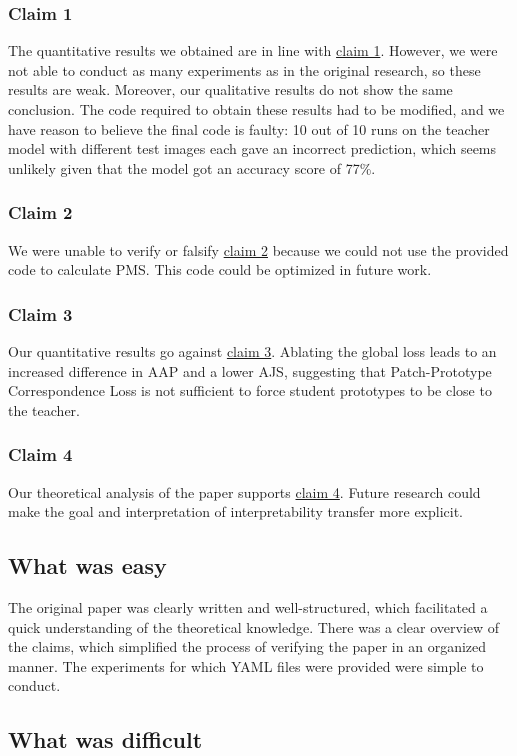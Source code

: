 \subsubsection{Claim 1}
The quantitative results we obtained are in line with \hyperlink{claim1}{claim 1}. However, we were not able to conduct as many experiments as in the original research, so these results are weak. Moreover, our qualitative results do not show the same conclusion. The code required to obtain these results had to be modified, and we have reason to believe the final code is faulty: 10 out of 10 runs on the teacher model with different test images each gave an incorrect prediction, which seems unlikely given that the model got an accuracy score of 77\%.\par
\subsubsection{Claim 2}
We were unable to verify or falsify \hyperlink{claim2}{claim 2} because we could not use the provided code to calculate PMS. This code could be optimized in future work.\par
\subsubsection{Claim 3}
Our quantitative results go against \hyperlink{claim3}{claim 3}. Ablating the global loss leads to an increased difference in AAP and a lower AJS, suggesting that Patch-Prototype Correspondence Loss is not sufficient to force student prototypes to be close to the teacher.
\subsubsection{Claim 4}
Our theoretical analysis of the paper supports \hyperlink{claim4}{claim 4}. Future research could make the goal and interpretation of interpretability transfer more explicit.


\subsection{What was easy}
The original paper was clearly written and well-structured, which facilitated a quick understanding of the theoretical knowledge. There was a clear overview of the claims, which simplified the process of verifying the paper in an organized manner. The experiments for which YAML files were provided were simple to conduct. 


\subsection{What was difficult}

